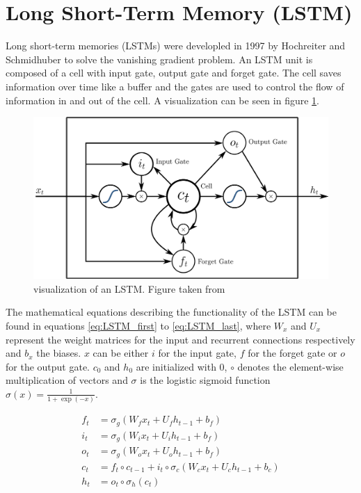 \section{Long Short-Term Memory (LSTM)}
\label{section:LSTM}

Long short-term memories (LSTMs) were developled in 1997 by Hochreiter and Schmidhuber \cite{LSTMHochreiter1997} to solve the vanishing gradient problem. An LSTM unit is composed of a cell with input gate, output gate and forget gate. The cell saves information over time like a buffer and the gates are used to control the flow of information in and out of the cell. A visualization can be seen in figure \ref{fig:LSTM}.

\begin{figure}[!htb]
	\centering
	\includegraphics[width=\textwidth]{images/LSTM.png}
	\caption{visualization of an LSTM. Figure taken from \protect\footnotemark} 
	\label{fig:LSTM}
\end{figure}


The mathematical equations describing the functionality of the LSTM can be found in equations \ref{eq:LSTM_first} to \ref{eq:LSTM_last}, where $W_x$ and $U_x$ represent the weight matrices for the input and recurrent connections respectively and $b_x$ the biases. $x$ can be either $i$ for the input gate, $f$ for the forget gate or $o$ for the output gate. $c_0$ and $h_0$ are initialized with 0, $\circ$ denotes the element-wise multiplication of vectors and $\sigma$ is the logistic sigmoid function $\sigma(x) = \frac{1}{1 + \exp(-x)}$.

\begin{align}
	f_t &= \sigma_g(W_f x_t + U_f h_{t-1} + b_f) 
	\label{eq:LSTM_first}\\
	i_t &= \sigma_g(W_i x_t + U_i h_{t-1} + b_f) \\ 
	o_t &= \sigma_g(W_o x_t + U_o h_{t-1} + b_f) \\ 
	c_t &= f_t \circ c_{t-1} + i_t \circ \sigma_c (W_c x_t + U_c h_{t-1} + b_c) \\
	h_t &= o_t \circ \sigma_h (c_t)
	\label{eq:LSTM_last}
\end{align}


